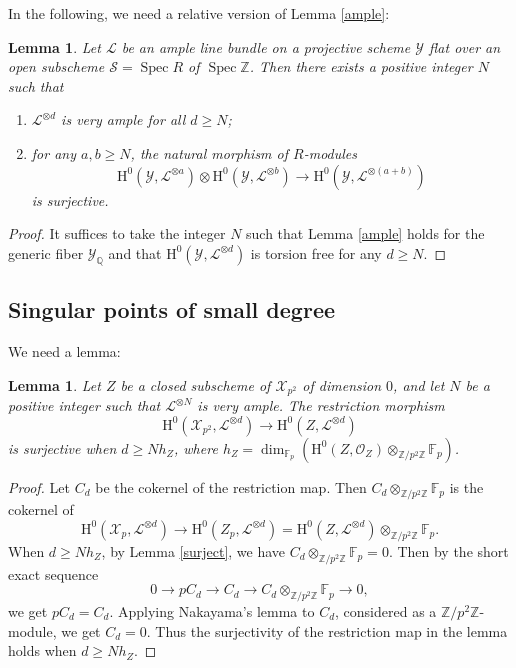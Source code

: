 \documentclass[11pt]{article}
\numberwithin{equation}{section}
\newenvironment{enumeratei}
{\bgroup\def\theenumi{\roman{enumi}}\def\theenumii{\arabic{enumii}}\begin{enumerate}}
{\end{enumerate}\egroup}
\theoremstyle{plain}
\newtheorem{lem}[thm]{Lemma}
\theoremstyle{definition}
\newcommand{\ho}{\mathrm{H}}
\newcommand{\X}{\mathcal{X}}
\newcommand{\li}{\mathcal{L}}
\newcommand{\Q}{\mathbb{Q}}
\newcommand{\Z}{\mathbb{Z}}
\newcommand{\F}{\mathbb{F}}
\DeclareMathOperator{\Spec}{Spec}
\begin{document}
In the following, we need a relative version of Lemma \ref{ample}:
\begin{lem}\label{relample}
Let $\li$ be an ample line bundle on a projective scheme $\mathcal{Y}$ flat over an open subscheme $\mathcal{S}=\Spec R$ of $\Spec \Z$.
Then there exists a positive integer $N$ such that
\begin{enumeratei}
\item $\li^{\otimes d}$ is very ample for all $d\geq N$;
\item for any $a, b\geq N$, the natural morphism of $R$-modules
\[
\ho^0(\mathcal{Y},\li^{\otimes a})\otimes \ho^0(\mathcal{Y},\li^{\otimes b})\to \ho^0(\mathcal{Y},\li^{\otimes (a+b)})
\]
is surjective.
\end{enumeratei}
\end{lem}
\begin{proof}
It suffices to take the integer $N$ such that Lemma \ref{ample} holds for the generic fiber $\mathcal{Y}_{\Q}$ and that $\ho^0(\mathcal{Y},\li^{\otimes d})$ is torsion free for any $d\geq N$.
\end{proof}

\subsection{Singular points of small degree}\label{step1}

We need a lemma:
\begin{lem}\label{sur}
Let $Z$ be a closed subscheme of $\X_{p^2}$ of dimension $0$, and let $N$ be a positive integer such that $\li^{\otimes N}$ is very ample.
The restriction morphism
\[
\ho^0(\X_{p^2}, \li^{\otimes d})\to \ho^0(Z, \li^{\otimes d})
\]
is surjective when $d\geq Nh_Z$, where $h_Z=\dim_{\F_p}\left(\ho^0(Z, \mathcal{O}_{Z})\otimes_{\Z/p^2\Z} \F_p\right)$.
\end{lem}
\begin{proof}
Let $C_d$ be the cokernel of the restriction map. Then $C_d\otimes_{\Z/p^2\Z}\F_{p}$ is the cokernel of
\[
\ho^0(\X_{p}, \li^{\otimes d})\to \ho^0(Z_p, \li^{\otimes d}) =\ho^0(Z, \li^{\otimes d}) \otimes_{\Z/p^2\Z} \F_p.
\]
When $d\geq Nh_Z$, by Lemma \ref{surject}, we have $C_d\otimes_{\Z/p^2\Z}\F_{p}=0$. Then by the short exact sequence
\[
0\to pC_d \to C_d \to C_d\otimes_{\Z/p^2\Z}\F_{p} \to 0,
\]
we get $pC_d=C_d$. Applying Nakayama's lemma to $C_d$, considered as a $\Z/p^2\Z$-module, we get $C_d=0$. Thus the surjectivity of the restriction map in the lemma holds when $d\geq Nh_Z$.
\end{proof}
\end{document}
